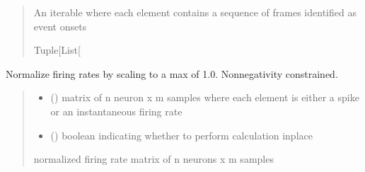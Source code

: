 \documentclass[letterpaper,10pt,english]{sphinxmanual}
\begin{document}
\begin{fulllineitems}
\begin{quote}
\begin{description}
\begin{itemize}
\end{itemize}

\sphinxAtStartPar
An iterable where each element contains a sequence of frames identified as event onsets

\sphinxAtStartPar
Tuple{[}List{[}\sphinxhref{https://docs.python.org/3/library/functions.html\#int}{int}{]}{]}

\end{description}\end{quote}

\end{fulllineitems}


\begin{fulllineitems}
\label{\detokenize{CalSciPy.event_processing:CalSciPy.event_processing.normalize_firing_rates}}
\pysigstartsignatures
{}
\pysigstopsignatures
\sphinxAtStartPar
Normalize firing rates by scaling to a max of 1.0. Non\sphinxhyphen{}negativity constrained.
\begin{quote}\begin{description}
\begin{itemize}
\item {} 
\sphinxAtStartPar
{} () \textendash{} matrix of n neuron x m samples where each element is either a spike or an
instantaneous firing rate

\item {} 
\sphinxAtStartPar
{} () \textendash{} boolean indicating whether to perform calculation in\sphinxhyphen{}place

\end{itemize}

\sphinxAtStartPar
normalized firing rate matrix of n neurons x m samples

\sphinxAtStartPar
{}

\end{description}\end{quote}

\end{fulllineitems}
\end{document}
